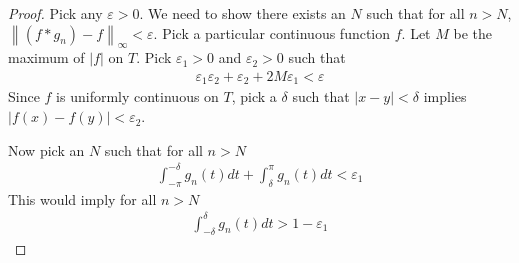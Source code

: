 \documentclass[12pt, titlepage]{article}
\theoremstyle{definition}
\newcommand{\vep}{\varepsilon}
\newcommand{\norm}[1]{\left\lVert#1\right\rVert}
\begin{document}
\begin{proof}
    Pick any $\vep > 0$. We need to show there exists an $N$ such that for all $n > N$, $\norm{(f \ast g_n) - f}_\infty < \vep$. Pick a particular continuous function $f$. Let $M$ be the maximum of $|f|$ on $T$. Pick $\vep_1 > 0$ and $\vep_2 > 0$ such that
    \begin{align}
        \vep_1 \vep_2 + \vep_2 + 2M\vep_1 < \vep \label{eq:3}
    \end{align}
    Since $f$ is uniformly continuous on $T$, pick a $\delta$ such that $|x-y| < \delta$ implies $|f(x) - f(y)| < \vep_2$.
    
    Now pick an $N$ such that for all $n > N$
    \begin{align*}
        \int_{-\pi}^{-\delta} g_n(t) dt + \int_{\delta}^{\pi} g_n(t) dt < \vep_1
    \end{align*}
    This would imply for all $n > N$
    \begin{align*}
        \int_{-\delta}^{\delta} g_n(t) dt > 1 - \vep_1
    \end{align*}
    

\end{proof}
\end{document}
